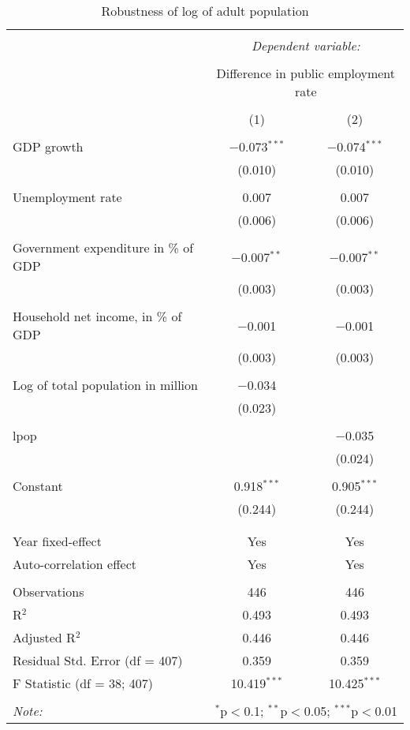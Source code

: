 
\begin{table}[!htbp] \centering 
  \caption{Robustness of log of adult population} 
  \label{} 
\begin{tabular}{@{\extracolsep{5pt}}lcc} 
\\[-1.8ex]\hline 
\hline \\[-1.8ex] 
 & \multicolumn{2}{c}{\textit{Dependent variable:}} \\ 
\cline{2-3} 
\\[-1.8ex] & \multicolumn{2}{c}{Difference in public employment rate} \\ 
\\[-1.8ex] & (1) & (2)\\ 
\hline \\[-1.8ex] 
 GDP growth & $-$0.073$^{***}$ & $-$0.074$^{***}$ \\ 
  & (0.010) & (0.010) \\ 
  & & \\ 
 Unemployment rate & 0.007 & 0.007 \\ 
  & (0.006) & (0.006) \\ 
  & & \\ 
 Government expenditure in \% of GDP & $-$0.007$^{**}$ & $-$0.007$^{**}$ \\ 
  & (0.003) & (0.003) \\ 
  & & \\ 
 Household net income, in \% of GDP & $-$0.001 & $-$0.001 \\ 
  & (0.003) & (0.003) \\ 
  & & \\ 
 Log of total population in million & $-$0.034 &  \\ 
  & (0.023) &  \\ 
  & & \\ 
 lpop &  & $-$0.035 \\ 
  &  & (0.024) \\ 
  & & \\ 
 Constant & 0.918$^{***}$ & 0.905$^{***}$ \\ 
  & (0.244) & (0.244) \\ 
  & & \\ 
\hline \\[-1.8ex] 
Year fixed-effect & Yes & Yes \\ 
Auto-correlation effect & Yes & Yes \\ 
\hline \\[-1.8ex] 
Observations & 446 & 446 \\ 
R$^{2}$ & 0.493 & 0.493 \\ 
Adjusted R$^{2}$ & 0.446 & 0.446 \\ 
Residual Std. Error (df = 407) & 0.359 & 0.359 \\ 
F Statistic (df = 38; 407) & 10.419$^{***}$ & 10.425$^{***}$ \\ 
\hline 
\hline \\[-1.8ex] 
\textit{Note:}  & \multicolumn{2}{r}{$^{*}$p$<$0.1; $^{**}$p$<$0.05; $^{***}$p$<$0.01} \\ 
\end{tabular} 
\end{table} 
